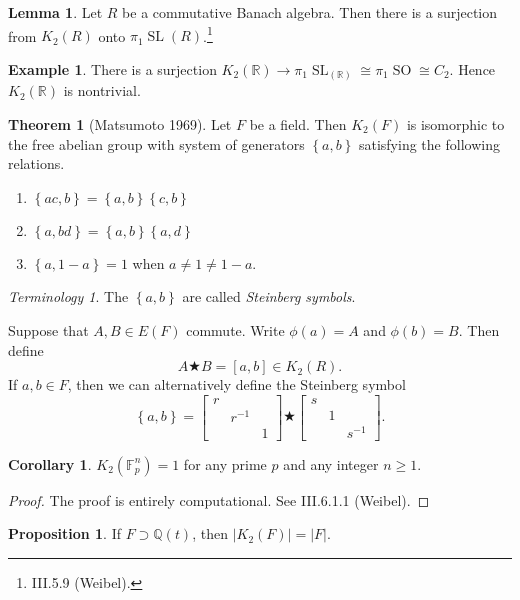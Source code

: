 \documentclass[10pt,letterpaper,cm]{nupset}
\theoremstyle{definition}
\newtheorem{exmp}[definition]{Example}
\theoremstyle{theorem}
\newtheorem{theorem}[definition]{Theorem}
\newtheorem{lemma}[definition]{Lemma}
\newtheorem{corollary}[definition]{Corollary}
\newtheorem{prop}[definition]{Proposition}
\theoremstyle{remark}
\newtheorem*{term}{Terminology}
\newcommand{\F}{\mathbb F}
\newcommand{\Q}{\mathbb Q}
\newcommand{\R}{\mathbb R}
\newcommand{\1}{\mathbf{1}}
\newcommand{\0}{\vec 0}
\DeclareMathOperator*{\SL}{SL}
\DeclareMathOperator*{\SO}{SO}
\begin{document}
\begin{lemma}
Let $R$ be a commutative Banach algebra. Then there is a surjection from $K_2(R)$ onto $\pi_1\SL(R)$.\footnote{III.5.9 (Weibel).} 
\end{lemma}

\begin{exmp}
There is a surjection $K_2(\R) \to \pi_1 \SL_(\R) \cong \pi_1\SO \cong C_2$. Hence $K_2(\R)$ is nontrivial.
\end{exmp}

\begin{theorem}[Matsumoto 1969]
Let $F$ be a field. Then $K_2(F)$ is isomorphic to the free abelian group with system of generators $\left\{a, b\right\}$  satisfying the following relations.
\begin{enumerate}[label=(\roman*)]
\item $\left\{ac, b\right\} = \left\{a, b\right\}\left\{c, b\right\}$
\item $\left\{a, bd\right\} = \left\{a, b\right\}\left\{a, d\right\}$
\item $\left\{a, 1-a\right\}=1$ when $a \ne 1 \ne 1-a$.
\end{enumerate}
\end{theorem}

\begin{term}
The $\left\{a,b\right\}$ are called \textit{Steinberg symbols}.
\end{term}

\smallskip

Suppose that $A, B \in E(F)$ commute. Write $\phi(a) =A$ and $\phi(b) = B$. Then define $$A \bigstar B =[a,b] \in K_2(R).$$ If $a,b\in F$, then we can alternatively define the Steinberg symbol $$\left\{a, b\right\} = \begin{bmatrix}
    r & & \\
    & r^{{-1}} & \\
    & & 1
  \end{bmatrix}
 \bigstar
  \begin{bmatrix}
    s & & \\
    & 1 & \\
    & & s^{{-1}}
  \end{bmatrix}
 .$$

\begin{corollary}
$K_2(\F_p^n) =1$ for any prime $p$ and any integer $n\geq 1$.
\end{corollary}
\begin{proof}
The proof is entirely computational. See III.6.1.1 (Weibel).
\end{proof}

\begin{prop}
If $F \supset \Q(t)$, then $\left\lvert{K_2(F)}\right\rvert = \left\lvert{F}\right\rvert$.
\end{prop}
\end{document}
